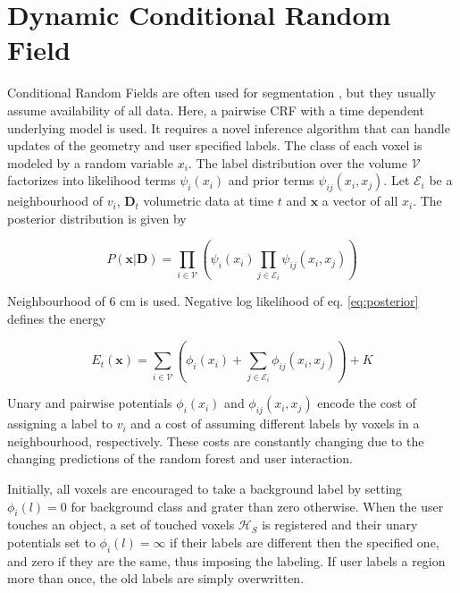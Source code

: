 \documentclass{llncs}
\begin{document}
\section{Dynamic Conditional Random Field}

 Conditional Random Fields are often used for segmentation \cite{VCRF}, but they usually assume availability of all data. Here, a pairwise CRF \cite{crf} with a time dependent underlying model is used. It requires a novel inference algorithm that can handle updates of the geometry and user specified labels. The class of each voxel is modeled by a random variable $x_i$. The label distribution over the volume $\mathcal{V}$ factorizes into likelihood terms $\psi_i(x_i)$ and prior terms $\psi_{ij}(x_i, x_j)$. Let $\mathcal{E}_i$ be a neighbourhood of $v_i$, $\mathbf{D}_t $ volumetric data at time $t$ and $\mathbf{x}$ a vector of all $x_i$. The posterior distribution is given by
 
  \begin{equation} \label{eq:posterior}
  P(\mathbf{x}|\mathbf{D}) = \prod_{i \in \mathcal{V}} \left( \psi_i(x_i) \prod_{j \in \mathcal{E}_i} \psi_{ij}(x_i, x_j) \right) 
  \end{equation}

  Neighbourhood of 6 cm is used. Negative log likelihood of eq. \ref{eq:posterior} defines the energy

  \begin{equation} \label{eq:energy}
  E_t(\mathbf{x}) = \sum_{i \in \mathcal{V}} \left( \phi_i(x_i) + \sum_{j \in \mathcal{E}_i} \phi_{ij} (x_i, x_j) \right) + K
  \end{equation}

  Unary and pairwise potentials $\phi_i(x_i)$ and $\phi_{ij}(x_i, x_j)$ encode the cost of assigning a label to $v_i$ and a cost of assuming different labels by voxels in a neighbourhood, respectively. These costs are constantly changing due to the changing predictions of the random forest and user interaction. 

  Initially, all voxels are encouraged to take a background label by setting $\phi_i(l) = 0$ for background class and grater than zero otherwise. When the user touches an object, a set of touched voxels $\mathcal{H}_S$ is registered and their unary potentials set to $\phi_i(l) = \infty$ if their labels are different then the specified one, and zero if they are the same, thus imposing the labeling. If user labels a region more than once, the old labels are simply overwritten. 
   
\end{document}
